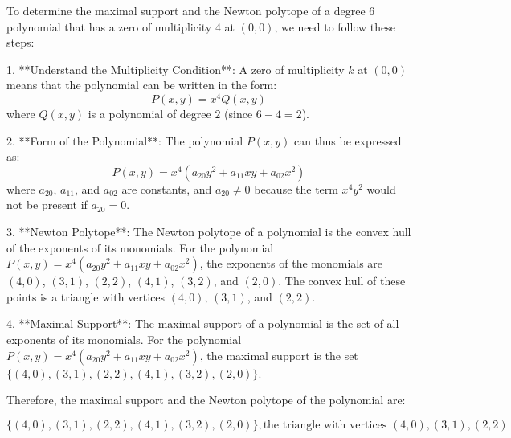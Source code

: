 To determine the maximal support and the Newton polytope of a degree 6 polynomial that has a zero of multiplicity 4 at \((0,0)\), we need to follow these steps:

1. **Understand the Multiplicity Condition**: A zero of multiplicity \(k\) at \((0,0)\) means that the polynomial can be written in the form:
   \[
   P(x,y) = x^4 Q(x,y)
   \]
   where \(Q(x,y)\) is a polynomial of degree \(2\) (since \(6 - 4 = 2\)).

2. **Form of the Polynomial**: The polynomial \(P(x,y)\) can thus be expressed as:
   \[
   P(x,y) = x^4 (a_{20} y^2 + a_{11} xy + a_{02} x^2)
   \]
   where \(a_{20}\), \(a_{11}\), and \(a_{02}\) are constants, and \(a_{20} \neq 0\) because the term \(x^4 y^2\) would not be present if \(a_{20} = 0\).

3. **Newton Polytope**: The Newton polytope of a polynomial is the convex hull of the exponents of its monomials. For the polynomial \(P(x,y) = x^4 (a_{20} y^2 + a_{11} xy + a_{02} x^2)\), the exponents of the monomials are \((4,0)\), \((3,1)\), \((2,2)\), \((4,1)\), \((3,2)\), and \((2,0)\). The convex hull of these points is a triangle with vertices \((4,0)\), \((3,1)\), and \((2,2)\).

4. **Maximal Support**: The maximal support of a polynomial is the set of all exponents of its monomials. For the polynomial \(P(x,y) = x^4 (a_{20} y^2 + a_{11} xy + a_{02} x^2)\), the maximal support is the set \(\{(4,0), (3,1), (2,2), (4,1), (3,2), (2,0)\}\).

Therefore, the maximal support and the Newton polytope of the polynomial are:

\[
\boxed{\{(4,0), (3,1), (2,2), (4,1), (3,2), (2,0)\}, \text{the triangle with vertices } (4,0), (3,1), (2,2)}
\]